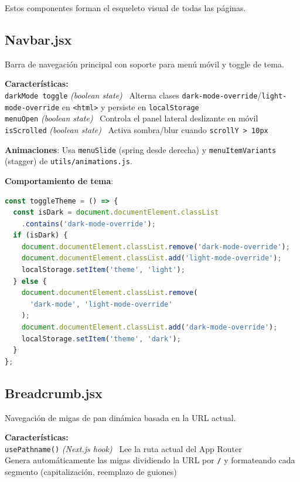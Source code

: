 \documentclass[12pt,a4paper]{article}
\newcommand{\prop}[3]{%
  \texttt{#1} \textit{(#2)} \textemdash\ #3\\%
}
\begin{document}
Estos componentes forman el esqueleto visual de todas las páginas.

\subsection{Navbar.jsx}

Barra de navegación principal con soporte para menú móvil y toggle de tema.

\begin{mdframed}[style=propbox]
\textbf{Características:}\\
\prop{darkMode toggle}{boolean state}{Alterna clases \texttt{dark-mode-override}/\texttt{light-mode-override} en \texttt{<html>} y persiste en \texttt{localStorage}}
\prop{menuOpen}{boolean state}{Controla el panel lateral deslizante en móvil}
\prop{isScrolled}{boolean state}{Activa sombra/blur cuando \texttt{scrollY > 10px}}
\end{mdframed}

\textbf{Animaciones}: Usa \texttt{menuSlide} (spring desde derecha) y \texttt{menuItemVariants} (stagger) de \texttt{utils/animations.js}.

\textbf{Comportamiento de tema}:
\begin{lstlisting}[language=JavaScript]
const toggleTheme = () => {
  const isDark = document.documentElement.classList
    .contains('dark-mode-override');
  if (isDark) {
    document.documentElement.classList.remove('dark-mode-override');
    document.documentElement.classList.add('light-mode-override');
    localStorage.setItem('theme', 'light');
  } else {
    document.documentElement.classList.remove(
      'dark-mode', 'light-mode-override'
    );
    document.documentElement.classList.add('dark-mode-override');
    localStorage.setItem('theme', 'dark');
  }
};
\end{lstlisting}

\subsection{Breadcrumb.jsx}

Navegación de migas de pan dinámica basada en la URL actual.

\begin{mdframed}[style=propbox]
\textbf{Características:}\\
\prop{usePathname()}{Next.js hook}{Lee la ruta actual del App Router}
Genera automáticamente las migas dividiendo la URL por \texttt{/} y formateando cada segmento (capitalización, reemplazo de guiones)
\end{mdframed}
\end{document}
